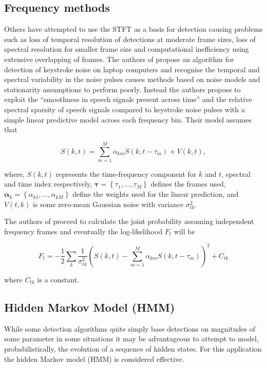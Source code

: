 \subsection{Frequency methods}
Others have attempted to use the STFT as a basis for detection \cite{Czyzewski1995}\cite{Subramanya2007}\cite{Sugiyama2007} causing problems such as loss of temporal resolution of detections at moderate frame sizes, loss of spectral resolution for smaller frame size and computational inefficiency using extensive overlapping of frames. The authors of \cite{Subramanya2007} propose an algorithm for detection of keystroke noise on laptop computers and recognise the temporal and spectral variability in the noise pulses causes methods based on noise models and stationarity assumptions to perform poorly. Instead the authors propose to exploit the ``smoothness in speech signals present across time'' and the relative spectral sparsity of speech signals compared to keystroke noise pulses with a simple linear predictive model across each frequency bin. Their model assumes that

\begin{equation}
\label{eq:Subramanya2007}
S(k,t) = \sum_{m=1}^M \alpha_{km} S(k,t - \tau_m) + V(k,t),
\end{equation}

where, $S(k,t)$ represents the time-frequency component for $k$ and $t$, spectral and time index respectively, $\boldsymbol{\tau} = \left\{\tau_1, \ldots ,\tau_M \right\}$ defines the frames used, $\boldsymbol{\alpha}_k = \left\{\alpha_{k1},\ldots,\alpha_{kM} \right\}$ define the weights used for the linear prediction, and $V(t,k)$ is some zero-mean Gaussian noise with variance $\sigma^2_{tk}$.

The authors of \cite{Subramanya2007} proceed to calculate the joint probability assuming independent frequency frames and eventually the log-likelihood $F_t$ will be

\begin{equation}
\label{eq:Subramanya2007_2}
F_t = - \frac{1}{2} \sum_k \frac{1}{\sigma^2_{tk}} \left( S\left(k,t\right) - \sum_{m=1}^M \alpha_{km} S(k,t-\tau_m)\right)^2 + C_{tk}
\end{equation}

where $C_{tk}$ is a constant.

\subsection{Hidden Markov Model (HMM)}
While some detection algorithms quite simply base detections on magnitudes of some parameter\cite{Subramanya2007}\cite{Sugiyama2007} in some situations it may be advantageous to attempt to model, probabilistically, the evolution of a sequence of hidden states. For this application the hidden Markov model (HMM) is considered effective\cite{Rabiner1989}\cite{Xu2005}.

